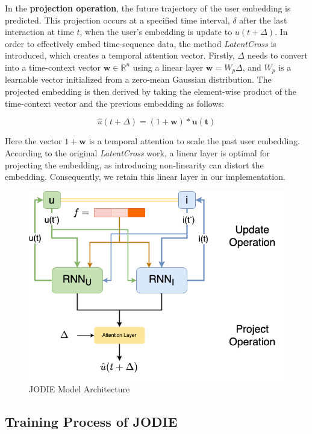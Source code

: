 In the \textbf{projection operation}, the future trajectory of the user embedding is predicted. This projection occurs at a specified time interval, $\delta$ after the last interaction at time $t$, when the user's embedding is update to $u(t+\Delta)$. 
In order to effectively embed time-sequence data, the method \textit{LatentCross}\cite{10.1145/3159652.3159727} is introduced, which creates a temporal attention vector. Firstly, $\Delta$ needs to convert into a time-context vector $\mathbf{w} \in \mathbb{R} ^n$ using a linear layer $\mathbf{w} =W_p \Delta$, and $W_p$ is a learnable vector initialized from a zero-mean Gaussian distribution. The projected embedding is then derived by taking the element-wise product of the time-context vector and the previous embedding as follows:

\[ \hat{u}(t+ \Delta) = (1+\mathbf{w})*\mathbf{u(t)} \]

Here the vector $1+\mathbf{w}$ is a temporal attention to scale the past user embedding. According to the original \textit{LatentCross} work, a linear layer is optimal for projecting the embedding, as introducing non-linearity can distort the embedding. Consequently, we retain this linear layer in our implementation.

\begin{figure}[h]
    \centering
    \includegraphics[width=0.8\linewidth]{figures/04_JODIE.png}
    \caption{JODIE Model Architecture}
    \label{fig:JODIE}
\end{figure}



\subsection{Training Process of JODIE}

